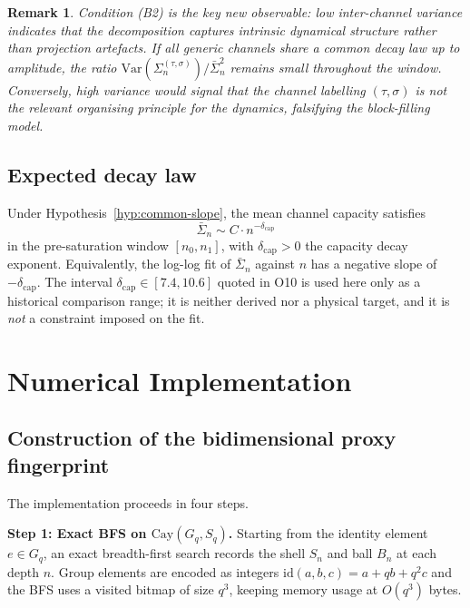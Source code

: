 \documentclass[11pt,a4paper]{article}
\newtheorem{remark}[theorem]{Remark}
\newcommand{\Sigbar}{\bar{\Sigma}}
\newcommand{\Sigblock}{\Sigma_n^{(\tau,\sigma)}}
\newcommand{\dcap}{\delta_{\mathrm{cap}}}
\begin{document}
    \begin{remark}
      Condition (B2) is the key new observable: low inter-channel variance indicates that the
      decomposition captures intrinsic dynamical structure rather than projection artefacts.
      If all generic channels share a common decay law up to amplitude, the ratio
      $\mathrm{Var}(\Sigblock)/\Sigbar_n^2$ remains small throughout the window.
      Conversely, high variance would signal that the channel labelling $(\tau,\sigma)$ is not the
      relevant organising principle for the dynamics, falsifying the block-filling model.
    \end{remark}

  \subsection{Expected decay law}
    \label{sec:scaling}

    Under Hypothesis~\ref{hyp:common-slope}, the mean channel capacity satisfies
    \begin{equation}
      \label{eq:scaling}
      \Sigbar_n \sim C \cdot n^{-\dcap}
    \end{equation}
    in the pre-saturation window $[n_0, n_1]$, with $\dcap > 0$ the capacity decay exponent.
    Equivalently, the log-log fit of $\Sigbar_n$ against $n$ has a negative slope of
    $-\dcap$.
    The interval $\delta_{\mathrm{cap}} \in [7.4, 10.6]$ quoted in O10 is used here only as a historical comparison
    range; it is neither derived nor a physical target, and it is \emph{not} a constraint imposed on the fit.

  \section{Numerical Implementation}
  \label{sec:implementation}

  \subsection{Construction of the bidimensional proxy fingerprint}
    \label{sec:impl-construction}

    The implementation proceeds in four steps.

    \textbf{Step 1: Exact BFS on $\mathrm{Cay}(G_q, S_q)$.}
    Starting from the identity element $e \in G_q$, an exact breadth-first search records the
    shell $S_n$ and ball $B_n$ at each depth $n$.
    Group elements are encoded as integers $\mathrm{id}(a,b,c) = a + qb + q^2 c$ and the BFS
    uses a visited bitmap of size $q^3$, keeping memory usage at $O(q^3)$ bytes.
\end{document}
